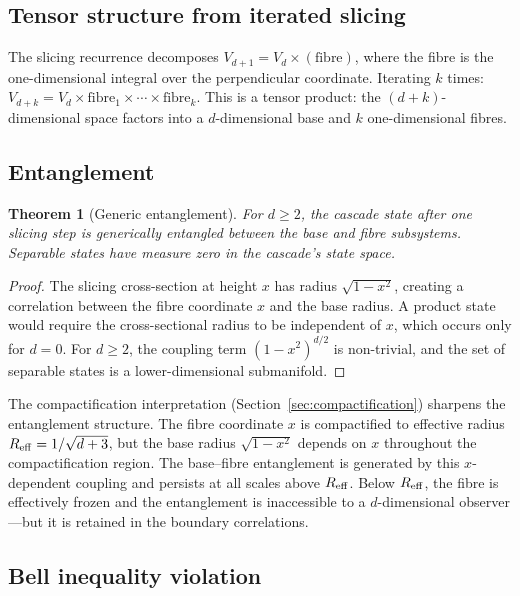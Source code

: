 \documentclass[12pt,a4paper]{article}
\newtheorem{theorem}{Theorem}[section]
\begin{document}
\subsection{Tensor structure from iterated slicing}

The slicing recurrence decomposes $V_{d+1}=V_d\times(\text{fibre})$, where the fibre is
the one-dimensional integral over the perpendicular coordinate. Iterating $k$ times:
$V_{d+k}=V_d\times\text{fibre}_1\times\cdots\times\text{fibre}_k$. This is a tensor
product: the $(d+k)$-dimensional space factors into a $d$-dimensional base and $k$
one-dimensional fibres.

\subsection{Entanglement}

\begin{theorem}[Generic entanglement]\label{thm:entangle}
For $d\geq 2$, the cascade state after one slicing step is generically entangled between
the base and fibre subsystems. Separable states have measure zero in the cascade's state
space.
\end{theorem}
\begin{proof}
The slicing cross-section at height $x$ has radius $\sqrt{1-x^2}$, creating a correlation
between the fibre coordinate $x$ and the base radius. A product state would require the
cross-sectional radius to be independent of $x$, which occurs only for $d=0$. For $d\geq 2$,
the coupling term $(1-x^2)^{d/2}$ is non-trivial, and the set of separable states is a
lower-dimensional submanifold.
\end{proof}

The compactification interpretation (Section~\ref{sec:compactification}) sharpens the
entanglement structure. The fibre coordinate $x$ is compactified to effective radius
$R_{\rm eff}=1/\sqrt{d+3}$, but the base radius $\sqrt{1-x^2}$ depends on $x$ throughout
the compactification region. The base--fibre entanglement is generated by this $x$-dependent
coupling and persists at all scales above $R_{\rm eff}$. Below $R_{\rm eff}$, the fibre is
effectively frozen and the entanglement is inaccessible to a $d$-dimensional observer---but
it is retained in the boundary correlations.

\subsection{Bell inequality violation}
\end{document}
